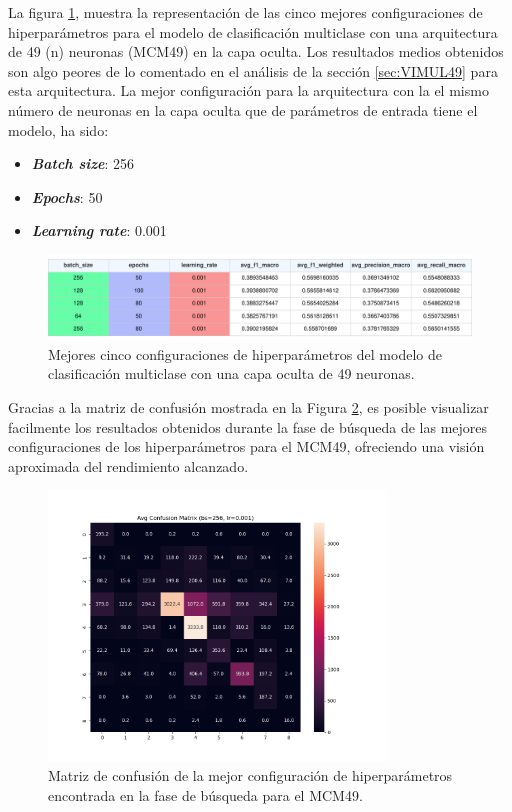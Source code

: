 La figura \ref{fig:MULhs49}, muestra la representación de las cinco mejores configuraciones de hiperparámetros para el modelo de clasificación multiclase con una arquitectura de 49 (n) neuronas (MCM49) en la capa oculta. Los resultados medios obtenidos son algo peores de lo comentado en el análisis de la sección \ref{sec:VIMUL49} para esta arquitectura. La mejor configuración para la arquitectura con la el mismo número de neuronas en la capa oculta que de parámetros de entrada tiene el modelo, ha sido:
\begin{itemize}
	\item \textbf{\textit{Batch size}}: 256
	\item \textbf{\textit{Epochs}}: 50
	\item \textbf{\textit{Learning rate}}: 0.001
\end{itemize}

\begin{figure}[H]
    \centering
    \includegraphics[width=1\textwidth]{./img/modelo/resultados/MULhs49.pdf}
    \caption{Mejores cinco configuraciones de hiperparámetros del modelo de clasificación multiclase con una capa oculta de 49 neuronas.}
    \label{fig:MULhs49}
\end{figure}

Gracias a la matriz de confusión mostrada en la Figura \ref{fig:MC_ENT_MCM49}, es posible visualizar facilmente los resultados obtenidos durante la fase de búsqueda de las mejores configuraciones de los hiperparámetros para el MCM49, ofreciendo una visión aproximada del rendimiento alcanzado.

\begin{figure}[H]
    \centering
    \includegraphics[width=0.8\textwidth]{./img/modelo/matrices_confusion/MC_ENT_MCM49.png}
    \caption{Matriz de confusión de la mejor configuración de hiperparámetros encontrada en la fase de búsqueda para el MCM49.}
    \label{fig:MC_ENT_MCM49}
\end{figure}



